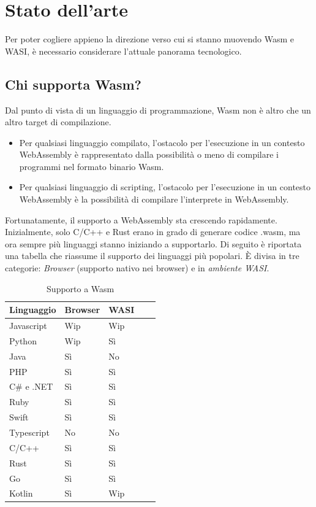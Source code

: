 \section{Stato dell'arte}
Per poter cogliere appieno la direzione verso cui si stanno muovendo Wasm e WASI, è necessario considerare l'attuale
panorama tecnologico. 

\subsection{Chi supporta Wasm?}
Dal punto di vista di un linguaggio di programmazione, Wasm non è altro che un altro target di compilazione.
\begin{itemize}
    \item Per qualsiasi linguaggio compilato, l'ostacolo per l'esecuzione in un contesto WebAssembly è rappresentato
    dalla possibilità o meno di compilare i programmi nel formato binario Wasm.
    \item Per qualsiasi linguaggio di scripting, l'ostacolo per l'esecuzione in un contesto WebAssembly è la possibilità
    di compilare l'interprete in WebAssembly.
\end{itemize}

Fortunatamente, il supporto a WebAssembly sta crescendo rapidamente. Inizialmente, solo C/C++ e Rust erano in grado di
generare codice .wasm, ma ora sempre più linguaggi stanno iniziando a supportarlo. Di seguito è riportata una tabella
che riassume il supporto dei linguaggi più popolari\cite{most-popular-technologies-stack-overflow}. È divisa in tre
categorie: \textit{Browser} (supporto nativo nei browser) e in
\textit{ambiente WASI}.
\begin{table}[H]
    \centering
    \begin{tabular}{|l|l|l|l|l|}
    \hline
        \textbf{Linguaggio} & \textbf{Browser} & \textbf{WASI} \\ \hline
        Javascript & Wip & Wip  \\ \hline
        Python & Wip & Sì  \\ \hline
        Java & Sì & No  \\ \hline
        PHP & Sì & Sì  \\ \hline
        C\# e .NET & Sì & Sì  \\ \hline
        Ruby & Sì & Sì  \\ \hline
        Swift & Sì & Sì  \\ \hline
        Typescript & No & No  \\ \hline
        C/C++ & Sì & Sì  \\ \hline
        Rust & Sì & Sì  \\ \hline
        Go & Sì & Sì  \\ \hline
        Kotlin & Sì & Wip  \\ \hline
    \end{tabular}
    \caption{Supporto a Wasm}
\end{table}

